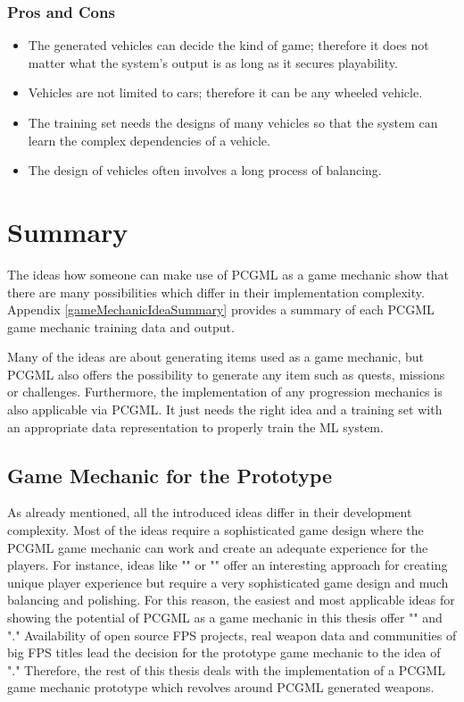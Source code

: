 \documentclass[MGS,Master,english]{twbook}%
\begin{document}
\subsubsection{Pros and Cons}
\begin{itemize}
	\item The generated vehicles can decide the kind of game; therefore it does not matter what the system's output is as long as it secures playability.
	\item Vehicles are not limited to cars; therefore it can be any wheeled vehicle.
	\item The training set needs the designs of many vehicles so that the system can learn the complex dependencies of a vehicle.
	\item The design of vehicles often involves a long process of balancing.
\end{itemize}

\section{Summary}
The ideas how someone can make use of \ac{PCGML} as a game mechanic show that there are many possibilities which differ in their implementation complexity. Appendix \ref{gameMechanicIdeaSummary} provides a summary of each \ac{PCGML} game mechanic training data and output.

Many of the ideas are about generating items used as a game mechanic, but \ac{PCGML} also offers the possibility to generate any item such as quests, missions or challenges. Furthermore, the implementation of any progression mechanics is also applicable via \ac{PCGML}. It just needs the right idea and a training set with an appropriate data representation to properly train the \ac{ML} system.

\subsection{Game Mechanic for the Prototype}
As already mentioned, all the introduced ideas differ in their development complexity. Most of the ideas require a sophisticated game design where the \ac{PCGML} game mechanic can work and create an adequate experience for the players. For instance, ideas like "" or "" offer an interesting approach for creating unique player experience but require a very sophisticated game design and much balancing and polishing. For this reason, the easiest and most applicable ideas for showing the potential of \ac{PCGML} as a game mechanic in this thesis offer "" and "." Availability of open source \ac{FPS} projects, real weapon data and communities of big \ac{FPS} titles lead the decision for the prototype game mechanic to the idea of "." Therefore, the rest of this thesis deals with the implementation of a \ac{PCGML} game mechanic prototype which revolves around \ac{PCGML} generated weapons.
\end{document}
